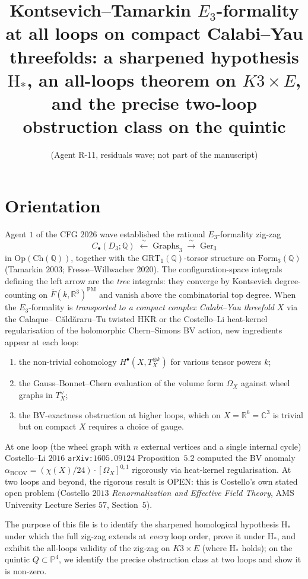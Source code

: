 \documentclass[11pt]{article}
\title{Kontsevich--Tamarkin $E_3$-formality at all loops on compact
Calabi--Yau threefolds: a sharpened hypothesis $\mathrm{H}_*$, an
all-loops theorem on $K3 \times E$, and the precise two-loop obstruction
class on the quintic}
\author{(Agent R-11, residuals wave; not part of the manuscript)}
\providecommand{\BCOV}{\mathrm{BCOV}}
\providecommand{\Om}{\Omega}
\providecommand{\RR}{\mathbb{R}}
\providecommand{\CC}{\mathbb{C}}
\providecommand{\QQ}{\mathbb{Q}}
\providecommand{\Ger}{\mathrm{Ger}}
\providecommand{\GRT}{\mathrm{GRT}}
\providecommand{\Graphs}{\mathrm{Graphs}}
\providecommand{\Form}{\mathrm{Form}}
\providecommand{\Op}{\mathrm{Op}}
\providecommand{\Ch}{\mathrm{Ch}}
\begin{document}
\maketitle

\section*{Orientation}

Agent $1$ of the CFG $2026$ wave established the rational $E_3$-formality
zig-zag
\[
  C_\bullet(D_3; \QQ) \;\xleftarrow{\;\sim\;}\; \Graphs_3 \;\xrightarrow{\;\sim\;}\; \Ger_3
\]
in $\Op(\Ch(\QQ))$, together with the $\GRT_1(\QQ)$-torsor structure on
$\Form_3(\QQ)$ (Tamarkin $2003$; Fresse--Willwacher $2020$).  The
configuration-space integrals defining the left arrow are the
\emph{tree} integrals: they converge by Kontsevich degree-counting on
$\overline{F}(k, \RR^3)^{\mathrm{FM}}$ and vanish above the
combinatorial top degree.  When the $E_3$-formality is \emph{transported
to a compact complex Calabi--Yau threefold} $X$ via the Calaque--
C\u ald\u araru--Tu twisted HKR or the Costello--Li heat-kernel
regularisation of the holomorphic Chern--Simons BV action, new
ingredients appear at each loop:
\begin{enumerate}[label=(\alph*)]
\item the non-trivial cohomology $H^\bullet(X, T_X^{\otimes k})$ for
various tensor powers $k$;
\item the Gauss--Bonnet--Chern evaluation of the volume form $\Om_X$
against wheel graphs in $T_X^\vee$;
\item the BV-exactness obstruction at higher loops, which on $X =
\RR^6 = \CC^3$ is trivial but on compact $X$ requires a choice of gauge.
\end{enumerate}
At one loop (the wheel graph with $n$ external vertices and a single
internal cycle) Costello--Li $2016$ \texttt{arXiv:$1605$.$09124$}
Proposition~$5.2$ computed the BV anomaly $\alpha_\BCOV =
(\chi(X)/24)\cdot [\Om_X]^{0,1}$ rigorously via heat-kernel
regularisation.  At two loops and beyond, the rigorous result is
OPEN: this is Costello's own stated open problem (Costello $2013$
\emph{Renormalization and Effective Field Theory}, AMS University
Lecture Series $57$, Section~$5$).

The purpose of this file is to identify the sharpened homological
hypothesis $\mathrm{H}_*$ under which the full zig-zag extends at
\emph{every} loop order, prove it under $\mathrm{H}_*$, and exhibit
the all-loops validity of the zig-zag on $K3 \times E$ (where
$\mathrm{H}_*$ holds); on the quintic $Q \subset \mathbb P^4$, we
identify the precise obstruction class at two loops and show it is
non-zero.
\end{document}
